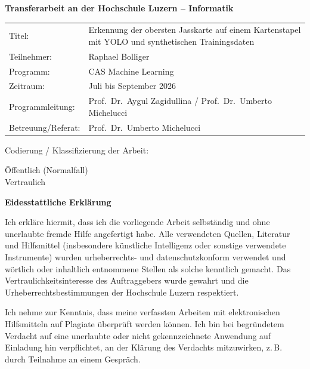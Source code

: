 {\large\bfseries Transferarbeit an der Hochschule Luzern -- Informatik\par}
\vspace{1.2em}

\noindent
\begin{tabular}{@{}p{4.0cm}p{11.6cm}@{}}
  Titel:                    & Erkennung der obersten Jasskarte auf einem Kartenstapel
                              mit YOLO und synthetischen Trainingsdaten \\[0.4em]
  Teilnehmer:               & Raphael Bolliger \\[0.4em]
  Programm:                 & CAS Machine Learning \\[0.4em]
  Zeitraum:                 & Juli bis September 2026 \\[0.4em]
  Programmleitung:          & Prof.\ Dr.\ Aygul Zagidullina / Prof.\ Dr.\ Umberto Michelucci \\[0.4em]
  Betreuung/Referat:        & Prof.\ Dr.\ Umberto Michelucci \\
\end{tabular}

\vspace{1.4em}
\noindent
Codierung / Klassifizierung der Arbeit:

\vspace{0.6em}
\noindent
{}\quad Öffentlich (Normalfall)\\[0.4em]
\framebox[2.4ex]{\rule[-0.25ex]{0pt}{1.9ex}\phantom{X}}\quad Vertraulich

\vspace{2em}
{\large\bfseries Eidesstattliche Erklärung\par}
\vspace{0.8em}

\noindent
Ich erkläre hiermit, dass ich die vorliegende Arbeit selbständig und ohne
unerlaubte fremde Hilfe angefertigt habe. Alle verwendeten Quellen, Literatur
und Hilfsmittel (insbesondere künstliche Intelligenz oder sonstige verwendete
Instrumente) wurden urheberrechts- und datenschutzkonform verwendet und
wörtlich oder inhaltlich entnommene Stellen als solche kenntlich gemacht. Das
Vertraulichkeitsinteresse des Auftraggebers wurde gewahrt und die
Urheberrechtsbestimmungen der Hochschule Luzern respektiert.

\vspace{0.8em}
\noindent
Ich nehme zur Kenntnis, dass meine verfassten Arbeiten mit elektronischen
Hilfsmitteln auf Plagiate überprüft werden können. Ich bin bei begründetem
Verdacht auf eine unerlaubte oder nicht gekennzeichnete Anwendung auf Einladung
hin verpflichtet, an der Klärung des Verdachts mitzuwirken, z.\,B. durch
Teilnahme an einem Gespräch.

